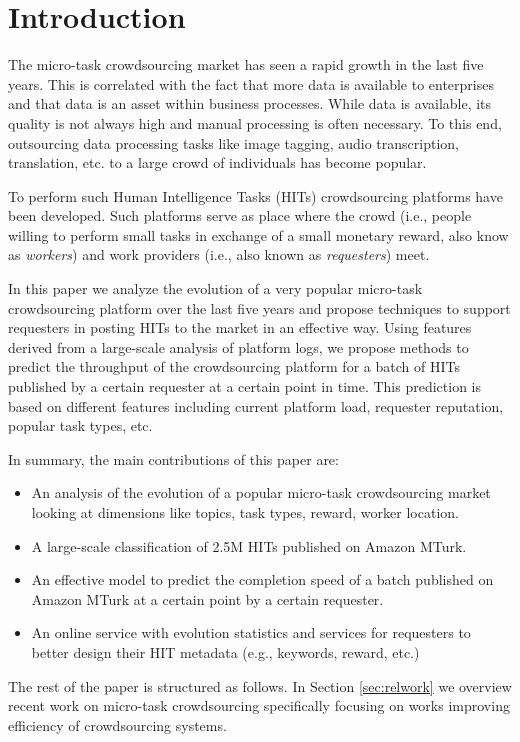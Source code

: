 \section{Introduction}\label{sec:intro}
The micro-task crowdsourcing market has seen a rapid growth in the last five years. This is correlated with the fact that more data is available to enterprises and that data is an asset within business processes. While data is available, its quality is not always high and manual processing is often necessary. To this end, outsourcing  data processing tasks  like image tagging, audio transcription, translation, etc. to a large crowd of individuals has become popular.

To perform such Human Intelligence Tasks (HITs) crowdsourcing platforms have been developed. Such platforms serve as place where the crowd (i.e., people willing to perform small tasks in exchange of a small monetary reward, also know as \emph{workers}) and work providers (i.e., also known as \emph{requesters}) meet. 

%
In this paper we analyze the evolution of a very popular micro-task crowdsourcing platform over the last five years and propose techniques to support requesters in posting HITs to the market in an effective way. Using features derived from a large-scale analysis of platform logs, we propose methods to predict the throughput of the crowdsourcing platform for a batch of HITs published by a certain requester at a certain point in time. This prediction is based on different features including current platform load, requester reputation, popular task types, etc.



In summary, the main contributions of this paper are:
\begin{itemize}

	\item An analysis of the evolution of a popular micro-task crowdsourcing market looking at dimensions like topics, task types, reward, worker location.

	\item A large-scale classification of 2.5M HITs published on Amazon MTurk.

	\item An effective model to predict the completion speed of a batch published on Amazon MTurk at a certain point by a certain requester.

	\item An online service with evolution statistics and services for requesters to better design their HIT metadata (e.g., keywords, reward, etc.)

\end{itemize}


The rest of the paper is structured as follows.
In Section \ref{sec:relwork} we overview recent work on micro-task crowdsourcing specifically focusing on works improving efficiency of crowdsourcing systems.